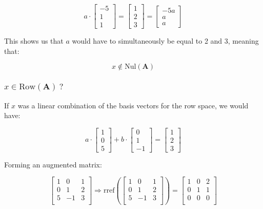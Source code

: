 \documentclass{article}
\begin{document}
\[%
    a \cdot \begin{bmatrix} -5\\1\\1 \end{bmatrix} 
    =
    \begin{bmatrix} 1\\2\\3 \end{bmatrix}
    =
    \begin{bmatrix} -5a\\a\\a \end{bmatrix} 
\]%

This shows us that $a$ would have to simultaneously be equal to 2 and 3, meaning
that:

\[%
    x  \notin \text{Nul}(\mathbf{A})
\]%

\subsubsection{$ x \in \text{Row}(\mathbf{A}) \ ?$}
If $x$ was a linear combination of the basis vectors for the row space, we
would have:


\[%
    a \cdot 
    \begin{bmatrix} 1\\0\\5 \end{bmatrix}
    +
    b  \cdot 
    \begin{bmatrix} 0\\1\\-1 \end{bmatrix}
    =
    \begin{bmatrix} 1\\2\\3 \end{bmatrix}
\]%

Forming an augmented matrix:

\[%
    \begin{bmatrix} 
        1 & 0 & 1 \\
		0 & 1 & 2 \\
		5 & -1 & 3 \\		
    \end{bmatrix}
    \Rightarrow 
    \text{rref} \left(
    \begin{bmatrix} 
        1 & 0 & 1 \\
		0 & 1 & 2 \\
		5 & -1 & 3 \\		
    \end{bmatrix}
    \right)
    =
    \begin{bmatrix} 
        1 & 0 & 2 \\
		0 & 1 & 1 \\
		0 & 0 & 0 \\		
    \end{bmatrix}
\]%
\end{document}
